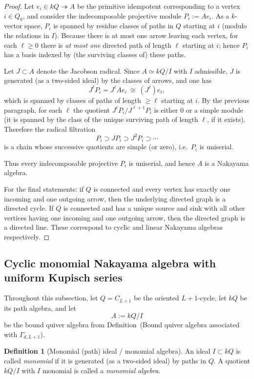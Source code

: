 \documentclass{article}
\theoremstyle{definition}
\newtheorem{definition}[theorem]{Definition}
\begin{document}
\begin{proof}
Let $e_i\in kQ\twoheadrightarrow A$ be the primitive idempotent corresponding to a vertex $i\in Q_0$, and consider the indecomposable projective module $P_i := Ae_i$.
As a $k$-vector space, $P_i$ is spanned by residue classes of paths in $Q$ starting at $i$ (modulo the relations in $I$).
Because there is at most one arrow leaving each vertex, for each $\ell\ge 0$ there is \emph{at most one} directed path of length $\ell$ starting at $i$; hence $P_i$ has a basis indexed by (the surviving classes of) these paths.

Let $J\subset A$ denote the Jacobson radical. Since $A\simeq kQ/I$ with $I$ admissible, $J$ is generated (as a two-sided ideal) by the classes of arrows, and one has
\[
J^\ell P_i = J^\ell Ae_i \ \cong\ (J^\ell)e_i,
\]
which is spanned by classes of paths of length $\ge \ell$ starting at $i$.
By the previous paragraph, for each $\ell$ the quotient $J^\ell P_i/J^{\ell+1}P_i$ is either $0$ or a simple module (it is spanned by the class of the unique surviving path of length $\ell$, if it exists).
Therefore the radical filtration
\[
P_i \supset JP_i \supset J^2P_i \supset \cdots
\]
is a chain whose successive quotients are simple (or zero), i.e.\ $P_i$ is uniserial.

Thus every indecomposable projective $P_i$ is uniserial, and hence $A$ is a Nakayama algebra.

For the final statements: if $Q$ is connected and every vertex has exactly one incoming and one outgoing arrow, then the underlying directed graph is a directed cycle. If $Q$ is connected and has a unique source and sink with all other vertices having one incoming and one outgoing arrow, then the directed graph is a directed line. These correspond to cyclic and linear Nakayama algebras respectively.
\end{proof}
\subsection{Cyclic monomial Nakayama algebra with uniform Kupisch series}
Throughout this subsection, let $Q=C_{L+1}$ be the oriented $L+1$-cycle, let $kQ$ be its path algebra, and let
\[
A:=kQ/I
\]
be the bound quiver algebra from Definition~(Bound quiver algebra associated with $\Gamma_{d,L+1}$).

\begin{definition}[Monomial (path) ideal / monomial algebra]
An ideal $I\subset kQ$ is called \emph{monomial} if it is generated (as a two-sided ideal) by paths in $Q$.
A quotient $kQ/I$ with $I$ monomial is called a \emph{monomial algebra}.
\end{definition}
\end{document}

